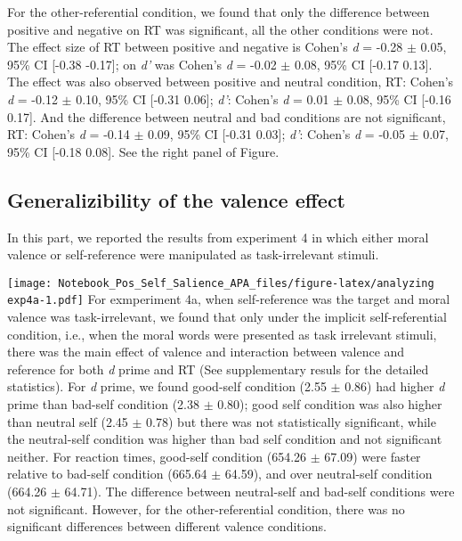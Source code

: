 \documentclass[man]{apa6}
\begin{document}
For the other-referential condition, we found that only the difference between positive and negative on RT was significant, all the other conditions were not. The effect size of RT between positive and negative is Cohen's \emph{d} = -0.28 \(\pm\) 0.05, 95\% CI {[}-0.38 -0.17{]}; on \emph{d'} was Cohen's \emph{d} = -0.02 \(\pm\) 0.08, 95\% CI {[}-0.17 0.13{]}. The effect was also observed between positive and neutral condition, RT: Cohen's \emph{d} = -0.12 \(\pm\) 0.10, 95\% CI {[}-0.31 0.06{]}; \emph{d'}: Cohen's \emph{d} = 0.01 \(\pm\) 0.08, 95\% CI {[}-0.16 0.17{]}. And the difference between neutral and bad conditions are not significant, RT: Cohen's \emph{d} = -0.14 \(\pm\) 0.09, 95\% CI {[}-0.31 0.03{]}; \emph{d'}: Cohen's \emph{d} = -0.05 \(\pm\) 0.07, 95\% CI {[}-0.18 0.08{]}. See the right panel of Figure.

\hypertarget{generalizibility-of-the-valence-effect}{%
\subsection{Generalizibility of the valence effect}\label{generalizibility-of-the-valence-effect}}

In this part, we reported the results from experiment 4 in which either moral valence or self-reference were manipulated as task-irrelevant stimuli.

\texttt{[image: Notebook\_Pos\_Self\_Salience\_APA\_files/figure-latex/analyzing exp4a-1.pdf]}
For exmperiment 4a, when self-reference was the target and moral valence was task-irrelevant, we found that only under the implicit self-referential condition, i.e., when the moral words were presented as task irrelevant stimuli, there was the main effect of valence and interaction between valence and reference for both \emph{d} prime and RT (See supplementary resuls for the detailed statistics). For \emph{d} prime, we found good-self condition (2.55 \(\pm\) 0.86) had higher \emph{d} prime than bad-self condition (2.38 \(\pm\) 0.80); good self condition was also higher than neutral self (2.45 \(\pm\) 0.78) but there was not statistically significant, while the neutral-self condition was higher than bad self condition and not significant neither. For reaction times, good-self condition (654.26 \(\pm\) 67.09) were faster relative to bad-self condition (665.64 \(\pm\) 64.59), and over neutral-self condition (664.26 \(\pm\) 64.71). The difference between neutral-self and bad-self conditions were not significant. However, for the other-referential condition, there was no significant differences between different valence conditions.
\end{document}
